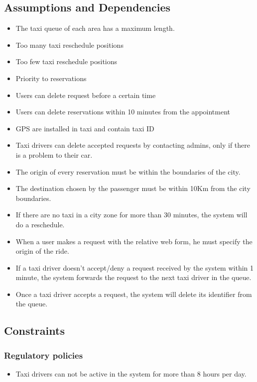 \documentclass{article}
\begin{document}
	\subsection{Assumptions and Dependencies}
	   \begin{itemize}
	        \item The taxi queue of each area has a maximum length.
	        \item Too many taxi reschedule positions
	        \item Too few taxi reschedule positions
	        \item Priority to reservations
	        \item Users can delete request before a certain time
	        \item Users can delete reservations within 10 minutes from the appointment
	        \item GPS are installed in taxi and contain taxi ID
	        \item Taxi drivers can delete accepted requests by contacting admins, only if there is a problem to their car.
	        \item The origin of every reservation must be within the boundaries of the city.
    	    \item The destination chosen by the passenger must be within 10Km from the city boundaries.
	        \item If there are no taxi in a city zone for more than 30 minutes, the system will do a reschedule.
	        \item When a user makes a request with the relative web form, he must specify the origin  of the ride.
	        \item If a taxi driver doesn't accept/deny a request received by the system within 1 minute, the system forwards the request to the next taxi driver in the queue.
	        \item Once a taxi driver accepts a request, the system will delete its identifier from the queue.
	    \end{itemize}
	
	\subsection{Constraints}
	    \subsubsection{Regulatory policies}
    	    \begin{itemize}
    	        \item Taxi drivers can not be active in the system for more than 8 hours per day.
    	    \end{itemize}
\end{document}
